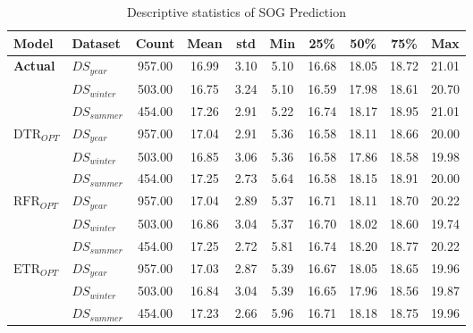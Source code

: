 \begin{table}[h]
    \footnotesize
    \centering
    {\begin{tabular}{ l l c c c c c c c c }
    \hline
    Model & Dataset & Count & Mean & std & Min & 25\% & 50\% & 75\% & Max \\
    \hline
    \textbf{{Actual}} & $DS_{year}$ & 957.00 &  16.99 &   3.10 & 5.10 &  16.68 &  18.05 &  18.72 &  21.01 \\
    & $DS_{winter}$ & 503.00 &  16.75 &   3.24 & 5.10 &  16.59 &  17.98 &  18.61 &  20.70 \\
    & $DS_{summer}$ & 454.00 &  17.26 &   2.91 & 5.22 &  16.74 &  18.17 &  18.95 &  21.01 \\
    \hline
    $\text{DTR}_{OPT}$ & $DS_{year}$ & 957.00 &  17.04 &   2.91 & 5.36 &  16.58 &  18.11 &  18.66 &  20.00 \\
    & $DS_{winter}$ & 503.00 &  16.85 &   3.06 & 5.36 &  16.58 &  17.86 &  18.58 &  19.98 \\
    & $DS_{summer}$ & 454.00 &  17.25 &   2.73 & 5.64 &  16.58 &  18.15 &  18.91 &  20.00 \\
    \hline
    $\text{RFR}_{OPT}$ & $DS_{year}$ & 957.00 &  17.04 &   2.89 & 5.37 &  16.71 &  18.11 &  18.70 &  20.22 \\
    & $DS_{winter}$ & 503.00 &  16.86 &   3.04 & 5.37 &  16.70 &  18.02 &  18.60 &  19.74 \\
    & $DS_{summer}$ & 454.00 &  17.25 &   2.72 & 5.81 &  16.74 &  18.20 &  18.77 &  20.22 \\
    \hline
    $\text{ETR}_{OPT}$ & $DS_{year}$ & 957.00 &  17.03 &   2.87 & 5.39 &  16.67 &  18.05 &  18.65 &  19.96 \\
    & $DS_{winter}$ & 503.00 &  16.84 &   3.04 & 5.39 &  16.65 &  17.96 &  18.56 &  19.87 \\
    & $DS_{summer}$ & 454.00 &  17.23 &   2.66 & 5.96 &  16.71 &  18.18 &  18.75 &  19.96 \\
    \hline
    \end{tabular}}
\caption{Descriptive statistics of SOG Prediction}\label{tbl:SOG_pred_descriptive}
\end{table}

